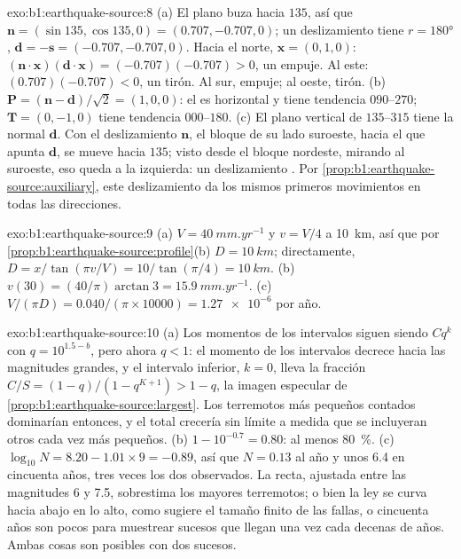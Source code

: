 \begin{solution}{exo:b1:earthquake-source:8}
(a) El plano buza hacia $135$, así que $\mathbf n = (\sin135, \cos135, 0) =
(0.707, -0.707, 0)$; un deslizamiento  tiene $r = \ang{180}$, $\mathbf d = -\mathbf s
= (-0.707, -0.707, 0)$. Hacia el norte, $\mathbf x = (0, 1, 0)$:
$(\mathbf n\cdot\mathbf x)(\mathbf d\cdot\mathbf x) = (-0.707)(-0.707) > 0$, un
empuje. Al este: $(0.707)(-0.707) < 0$, un tirón. Al sur, empuje; al oeste, tirón.
(b) $\mathbf P = (\mathbf n - \mathbf d)/\sqrt2 = (1, 0, 0)$: el  es
horizontal y tiene tendencia $090$--$270$; $\mathbf T = (0, -1, 0)$ tiene tendencia
$000$--$180$. (c) El plano vertical de  $135$--$315$ tiene la normal
$\mathbf d$. Con el deslizamiento $\mathbf n$, el bloque de su lado suroeste, hacia el que apunta
$\mathbf d$, se mueve hacia $135$; visto desde el bloque nordeste, mirando al suroeste, eso
queda a la izquierda: un deslizamiento . Por
\cref{prop:b1:earthquake-source:auxiliary}, este deslizamiento da los mismos primeros
movimientos en todas las direcciones.
\end{solution}

\begin{solution}{exo:b1:earthquake-source:9}
(a) $V = \qty{40}{mm.yr^{-1}}$ y $v = V/4$ a \qty{10}{km}, así que por
\cref{prop:b1:earthquake-source:profile}(b) $D = \qty{10}{km}$; directamente,
$D = x/\tan(\pi v/V) = 10/\tan(\pi/4) = \qty{10}{km}$. (b) $v(30) =
(40/\pi)\arctan 3 = \qty{15.9}{mm.yr^{-1}}$. (c) $V/(\pi D) =
\num{0.040}/(\pi\times\num{10000}) = \num{1.27e-6}$ por año.
\end{solution}

\begin{solution}{exo:b1:earthquake-source:10}
(a) Los momentos de los intervalos siguen siendo $C q^k$ con $q = 10^{1.5 - b}$, pero ahora $q < 1$: el momento de los intervalos
decrece hacia las magnitudes grandes, y el intervalo inferior, $k = 0$, lleva la fracción $C/S = (1 - q)/(1 - q^{K+1}) > 1 - q$, la imagen
especular de \cref{prop:b1:earthquake-source:largest}. Los terremotos más pequeños contados dominarían entonces, y el total crecería sin
límite a medida que se incluyeran otros cada vez más pequeños. (b) $1 - 10^{-0.7} = 0.80$: al menos
\qty{80}{\percent}. (c) $\log_{10}N = 8.20 - 1.01\times9 = -0.89$, así que $N = 0.13$
al año y unos 6.4 en cincuenta años, tres veces los dos observados. La recta,
ajustada entre las magnitudes 6 y 7.5, sobrestima los mayores terremotos; o bien la ley
se curva hacia abajo en lo alto, como sugiere el tamaño finito de las fallas, o cincuenta
años son pocos para muestrear sucesos que llegan una vez cada decenas de años. Ambas
cosas son posibles con dos sucesos.
\end{solution}

